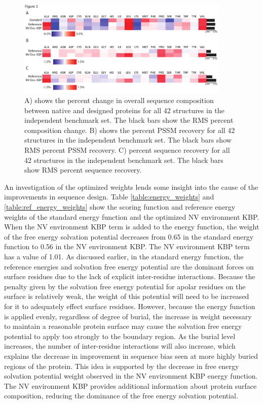 \begin{figure}
\centering
\includegraphics[width=4in]{figures/nv_kbp/overall_independent_changes}
\caption{
A) shows the percent change in overall sequence composition between native and designed proteins for all 42 structures in the independent benchmark set.
The black bars show the \acs{RMS} percent composition change. 
B) shows the percent \acs{PSSM} recovery for all 42 structures in the independent benchmark set.
The black bars show \acs{RMS} percent \acs{PSSM} recovery.  
C) percent sequence recovery for all 42 structures in the independent benchmark set.
The black bars show \acs{RMS} percent sequence recovery.
}
\label{fig:overall_independent_changes}
\end{figure}
 
An investigation of the optimized weights lends some insight into the cause of the improvements in sequence design.
 Table \ref{table:energy_weights} and \ref{table:ref_energy_weights} show the scoring function and reference energy weights of the standard energy function and the optimized \ac{NV} environment \ac{KBP}.
When the \ac{NV} environment \ac{KBP} term is added to the energy function, the weight of the free energy solvation potential decreases from 0.65 in the standard energy function to 0.56 in the \ac{NV} environment \ac{KBP}. 
The \ac{NV} environment \ac{KBP} term has a value of 1.01.
As discussed earlier, in the standard energy function, the reference energies and solvation free energy potential are the dominant forces on surface residues due to the lack of explicit inter-residue interactions.
Because the penalty given by the solvation free energy potential for apolar residues on the surface is relatively weak, the weight of this potential will need to be increased for it to adequately effect surface residues.
However, because the energy function is applied evenly, regardless of degree of burial, the increase in weight necessary to maintain a reasonable protein surface may cause the solvation free energy potential to apply too strongly to the boundary region.
As the burial level increases, the number of inter-residue interactions will also increase, which explains the decrease in improvement in sequence bias seen at more highly buried regions of the protein.
This idea is supported by the decrease in free energy solvation potential weight observed in the \ac{NV} environment \ac{KBP} energy function.
The \ac{NV} environment \ac{KBP} provides additional information about protein surface composition, reducing the dominance of the free energy solvation potential.


